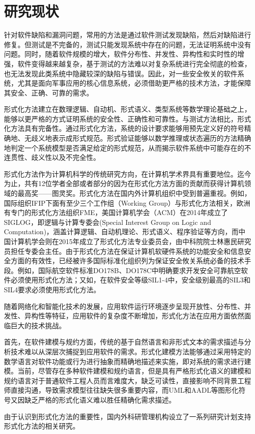 \section{研究现状}
\par
针对软件缺陷和漏洞问题，常用的方法是通过软件测试发现缺陷，然后对缺陷进行修复。但测试是不完备的，测试只能发现系统中存在的问题，无法证明系统中没有问题。同时，随着软件规模的增大，软件分布性、并发性、异构性和实时性的增强，软件变得越来越复杂，基于测试的方法难以对复杂系统进行完全彻底的检查，也无法发现此类系统中隐藏较深的缺陷与错误。因此，对一些安全攸关的软件系统，尤其是面向军事应用的核心信息系统，必须借助更严格的技术方法，才能保障其安全、正确、可靠的需求。
\par
形式化方法建立在数理逻辑、自动机、形式语义、类型系统等数学理论基础之上，能够以更严格的方式证明系统的安全性、正确性和可靠性。与测试方法相比，形式化方法具有完备性。通过形式化方法，系统的设计要求能够用预先定义好的符号精确地、无歧义地表示成形式规范。形式验证能够以数学推理或状态遍历的方法精确地判定一个系统模型是否满足给定的形式规范，从而揭示软件系统中可能存在的不连贯性、歧义性以及不完全性。
\par
形式化方法作为计算机科学的传统研究方向，在计算机学术界具有重要地位。迄今为止，共有12位学者全部或者部分的因为在形式化方法方面的贡献而获得计算机领域的最高奖——图灵奖。形式化方法在国内外计算机组织中受到普遍重视。例如，国际组织IFIP下面有至少三个工作组（Working Group）与形式化方法相关，欧洲有专门的形式化方法组织FME，美国计算机学会（ACM）在2014年成立了SIGLOG，即逻辑与计算专委会(Special Interest Group on Logic and Computation)，涵盖计算逻辑、自动机理论、形式语义、程序验证等方向，而中国计算机学会则在2015年成立了形式化方法专业委员会，由中科院院士林惠民研究员担任专委会主任。由于形式化方法在保证计算机软硬件系统的功能安全和信息安全方面的有效性，已经被许多国际标准化组织列为保证安全攸关系统必备的技术手段。例如，国际航空软件标准DO178B、DO178C中明确要求开发安全可靠航空软件必须使用形式化方法；又如，在软件安全等级SIL1-4中，安全级别最高的SIL3和SIL4要求必须使用形式化方法。
\par
随着网络化和智能化技术的发展，应用软件运行环境逐步呈现开放性、分布性、并发性、异构性等特征，应用软件的复杂度不断增加，形式化方法在应用方面依然面临巨大的技术挑战。
\par
首先，在软件建模与规约方面，传统的基于自然语言和非形式文本的需求描述与分析技术难以从深层次捕捉到应用软件的需求。形式化建模方法能够通过采用特定的数学语言对软件功能或行为进行抽象而精确地描述来实施，即对系统的需求进行建模。当前，尽管存在多种软件建模和规约语言，但是具有严格形式化语义的建模和规约语言对于普通软件工程人员而言难度大，缺乏可读性，直接影响不同背景工程师直接沟通，导致需求模型往往缺失很多重要内容，而UML和AADL等图形化符号又因缺乏严格的形式化语义难以胜任精确化需求描述。
\par
由于认识到形式化方法的重要性，国内外科研管理机构设立了一系列研究计划支持形式化方法的相关研究。
